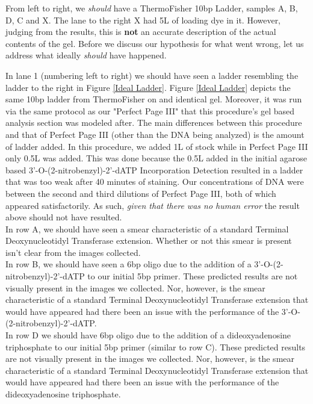 \documentclass[letterpaper]{article}
\newcommand{\tdt}{Terminal Deoxynucleotidyl Transferase}
\newcommand{\uL}{\micro{}L}
\newcommand{\BdATP}{3'-O-(2-nitrobenzyl)-2'-dATP}
\begin{document}
From left to right, we \textit{should} have a ThermoFisher 10bp  Ladder, samples A, B, D, C and X. The lane to the right X had 5\uL{} of loading dye in it. However, judging from the results, this is \textbf{not} an accurate description of the actual contents of the gel. Before we discuss our hypothesis for what went wrong, let us address what ideally \textit{should} have happened.

In lane 1 (numbering left to right) we should have seen a ladder resembling the ladder to the right in Figure \ref{Ideal Ladder}. Figure \ref{Ideal Ladder} depicts the same 10bp ladder from ThermoFisher on and identical gel. Moreover, it was run via the same protocol as our "Perfect Page III" that this procedure's gel based analysis section was modeled after. The main differences between this procedure and that of Perfect Page III (other than the DNA being analyzed) is the amount of ladder added. In this procedure, we added 1\uL{} of stock while in Perfect Page III only 0.5\uL{} was added. This was done because the 0.5\uL{} added in the initial agarose based \BdATP{} Incorporation Detection resulted in a ladder that was too weak after 40 minutes of staining. Our concentrations of DNA were between the second and third dilutions of Perfect Page III, both of which appeared satisfactorily. As such, \textit{given that there was no human error} the result above should not have resulted.\\

In row A, we should have seen a smear characteristic of a standard \tdt{} extension. Whether or not this smear is present isn't clear from the images collected.\\ 

In row B, we should have seen a 6bp oligo due to the addition of a \BdATP{} to our initial 5bp primer. These predicted results are not visually present in the images we collected. Nor, however, is the smear characteristic of a standard \tdt{} extension that would have appeared had there been an issue with the performance of the \BdATP{}.\\

In row D we should have 6bp oligo due to the addition of a dideoxyadenosine triphosphate to our initial 5bp primer (similar to row C). These predicted results are not visually present in the images we collected. Nor, however, is the smear characteristic of a standard \tdt{} extension that would have appeared had there been an issue with the performance of the dideoxyadenosine triphosphate.\\
\end{document}
